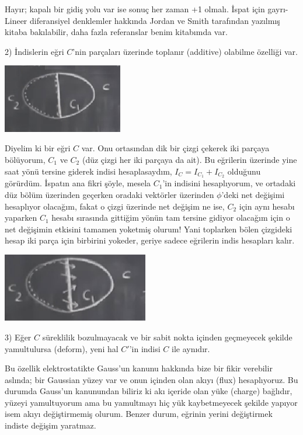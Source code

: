 \documentclass[12pt,fleqn]{article}\usepackage{../../common}
\begin{document}
Hayır; kapalı bir gidiş yolu var ise sonuç her zaman +1 olmalı. İspat için
gayrı-Lineer diferansiyel denklemler hakkında  Jordan ve Smith tarafından
yazılmış kitaba bakılabilir, daha fazla referanslar benim kitabımda var.

2) İndislerin eğri $C$'nin parçaları üzerinde toplanır (additive) olabilme
özelliği var.

\includegraphics[height=3cm]{08_26.png}

Diyelim ki bir eğri $C$ var. Onu ortasından dik bir çizgi çekerek iki parçaya
bölüyorum, $C_1$ ve $C_2$ (düz çizgi her iki parçaya da ait). Bu eğrilerin
üzerinde yine saat yönü tersine giderek indisi hesaplasaydım, $I_C = I_{C_1} +
I_{C_2}$ olduğunu görürdüm. İspatın ana fikri şöyle, mesela $C_1$'in indisini
hesaplıyorum, ve ortadaki düz bölüm üzerinden geçerken oradaki vektörler
üzerinden $\phi$'deki net değişimi hesaplıyor olacağım, fakat o çizgi üzerinde
net değişim ne ise, $C_2$ için aynı hesabı yaparken $C_1$ hesabı sırasında
gittiğim yönün tam tersine gidiyor olacağım için o net değişimin etkisini
tamamen yoketmiş olurum! Yani toplarken bölen çizgideki hesap iki parça için
birbirini yokeder, geriye sadece eğrilerin indis hesapları kalır. 

\includegraphics[height=3cm]{08_27.png}

3) Eğer $C$ süreklilik bozulmayacak ve bir sabit nokta içinden geçmeyecek
şekilde yamultulursa (deform), yeni hal $C'$'in indisi $C$ ile aynıdır.

Bu özellik elektrostatikte Gauss'un kanunu hakkında bize bir fikir verebilir
aslında; bir Gaussian yüzey var ve onun içinden olan akıyı (flux)
hesaplıyoruz. Bu durumda Gauss'un kanunundan biliriz ki akı içeride olan yüke
(charge) bağlıdır, yüzeyi yamultuyorum ama bu yamultmayı hiç yük kaybetmeyecek
şekilde yapıyor isem akıyı değiştirmemiş olurum. Benzer durum, eğrinin yerini
değiştirmek indiste değişim yaratmaz.
\end{document}
